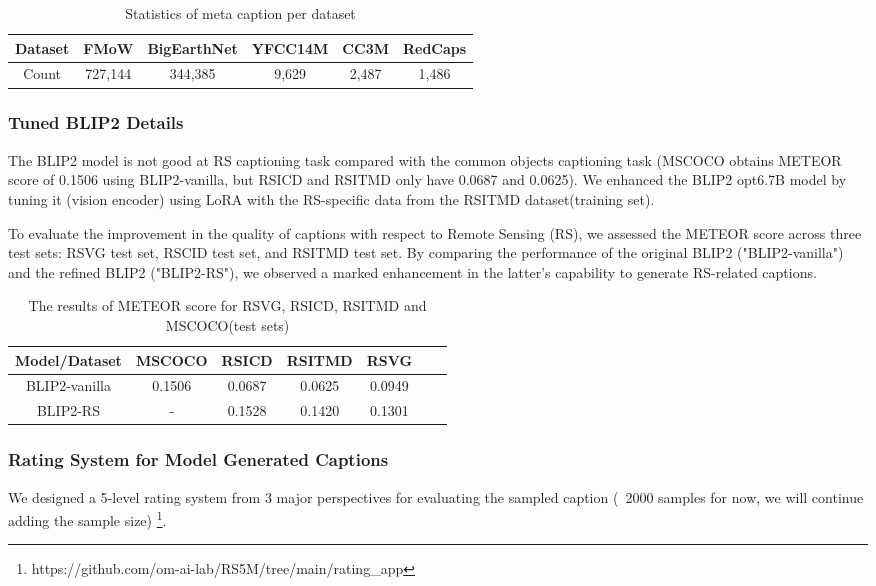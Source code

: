 \documentclass[journal]{IEEEtran}
\begin{document}
\begin{table}[H]
\caption{Statistics of meta caption per dataset}
\centering \begin{tabular}{|c|c|c|c|c|c|}\hline
  Dataset & FMoW  & BigEarthNet & YFCC14M & CC3M & RedCaps \\ \hline
  Count & 727,144 & 344,385 & 9,629 & 2,487 & 1,486 \\ \hline
\end{tabular}
\end{table}


\subsubsection{Tuned BLIP2 Details}
\label{appendix:tunedblip2}
The BLIP2 model is not good at RS captioning task compared with the common objects captioning task (MSCOCO obtains METEOR score of 0.1506 using BLIP2-vanilla, but RSICD and RSITMD only have 0.0687 and 0.0625). We enhanced the BLIP2 opt6.7B model by tuning it (vision encoder) using LoRA with the RS-specific data from the RSITMD dataset(training set). 

To evaluate the improvement in the quality of captions with respect to Remote Sensing (RS), we assessed the METEOR score across three test sets: RSVG test set, RSCID test set, and RSITMD test set. By comparing the performance of the original BLIP2 ("BLIP2-vanilla") and the refined BLIP2 ("BLIP2-RS"), we observed a marked enhancement in the latter's capability to generate RS-related captions.

\begin{table}[H]
\caption{The results of METEOR score for RSVG, RSICD, RSITMD and MSCOCO(test sets)}
\centering \begin{tabular}{|c|c|c|c|c|c|c|}\hline
    \textbf{Model/Dataset} &	MSCOCO	& RSICD	& RSITMD	& RSVG \\ \hline
  BLIP2-vanilla &	0.1506	& 0.0687	& 0.0625&	0.0949\\ \hline
  BLIP2-RS &	- &	0.1528 &	0.1420 &	0.1301 \\ \hline
\end{tabular}
\end{table}



\subsubsection{Rating System for Model Generated Captions}
\label{appendix:ratingexp}
We designed a 5-level rating system from 3 major perspectives for evaluating the sampled caption (~2000 samples for now, we will continue adding the sample size) \footnote{https://github.com/om-ai-lab/RS5M/tree/main/rating\_app}. 
\end{document}
